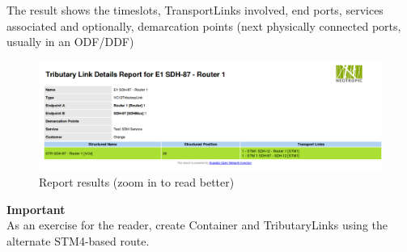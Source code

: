 \documentclass[a4paper]{article}
\begin{document}
		The result shows the timeslots, TransportLinks involved, end ports, services associated and optionally, demarcation points (next physically connected ports, usually in an ODF/DDF)
		\begin{figure}[h!]
			\centering
			\includegraphics[width=\linewidth]{img/sdh_module_tributary_link_report.png}
			\caption{Report results (zoom in to read better)}
			\label{fig:sdh_module_tributary_link_report}
			\end{figure}
		
		\begin{framed} {\large \textbf{Important}}\\
			As an exercise for the reader, create Container and TributaryLinks using the alternate STM4-based route.
		\end{framed}	
\end{document}
